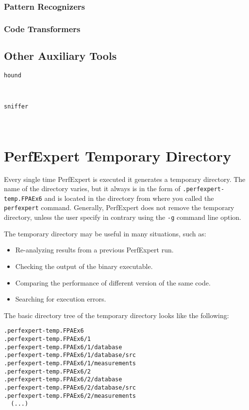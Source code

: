 \subsubsection{Pattern Recognizers}

\subsubsection{Code Transformers}

\subsection{Other Auxiliary Tools}

\begin{description}
	\item[\texttt{hound}]\hfill \\
	
	\item[\texttt{sniffer}]\hfill \\
\end{description}

\section{PerfExpert Temporary Directory}

Every single time PerfExpert is executed it generates a temporary directory. The name of the directory varies, but it always is in the form of \texttt{.perfexpert-temp.FPAEx6} and is located in the directory from where you called the \texttt{perfexpert} command. Generally, PerfExpert does not remove the temporary directory, unless the user specify in contrary using the \texttt{-g} command line option.

The temporary directory may be useful in many situations, such as:

\begin{itemize}
	\item Re-analyzing results from a previous PerfExpert run.
	\item Checking the output of the binary executable.
	\item Comparing the performance of different version of the same code.
	\item Searching for execution errors.
\end{itemize}

The basic directory tree of the temporary directory looks like the following:

\begin{verbatim}
.perfexpert-temp.FPAEx6
.perfexpert-temp.FPAEx6/1
.perfexpert-temp.FPAEx6/1/database
.perfexpert-temp.FPAEx6/1/database/src
.perfexpert-temp.FPAEx6/1/measurements
.perfexpert-temp.FPAEx6/2
.perfexpert-temp.FPAEx6/2/database
.perfexpert-temp.FPAEx6/2/database/src
.perfexpert-temp.FPAEx6/2/measurements
  (...)
\end{verbatim}


